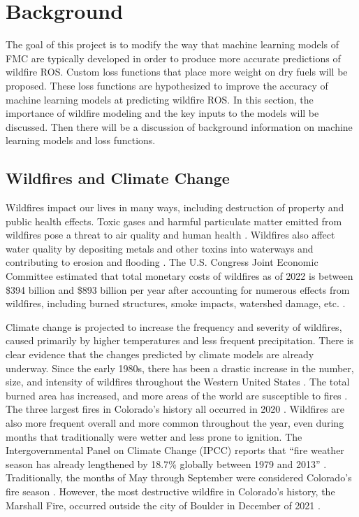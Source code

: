 \documentclass[11pt]{article}%
\begin{document}
\newpage
\tableofcontents
\newpage

\section{Background}

The goal of this project is to modify the way that machine learning models of FMC are typically developed in order to produce more accurate predictions of wildfire ROS. Custom loss functions that place more weight on dry fuels will be proposed. These loss functions are hypothesized to improve the accuracy of machine learning models at predicting wildfire ROS. In this section, the importance of wildfire modeling and the key inputs to the models will be discussed. Then there will be a discussion of background information on machine learning models and loss functions.

\subsection{Wildfires and Climate Change}

Wildfires impact our lives in many ways, including destruction of property and public health effects. Toxic gases and harmful particulate matter emitted from wildfires pose a threat to air quality and human health \citep[e.g.,][]{WHO-2024-WFS}. Wildfires also affect water quality by depositing metals and other toxins into waterways and contributing to erosion and flooding \citep{USGS-2024-WQA}. The U.S. Congress Joint Economic Committee estimated that total monetary costs of wildfires as of 2022 is between \$394 billion and \$893 billion per year after accounting for numerous effects from wildfires, including burned structures, smoke impacts, watershed damage, etc. \citep{JEC-2023-CEW}.

Climate change is projected to increase the frequency and severity of wildfires, caused primarily by higher temperatures and less frequent precipitation. There is clear evidence that the changes predicted by climate models are already underway. Since the early 1980s, there has been a drastic increase in the number, size, and intensity of wildfires throughout the Western United States \citep{Cartier-2022-UFQ}. The total burned area has increased, and more areas of the world are susceptible to fires \citep{IPCC-2021-LCI}. The three largest fires in Colorado’s history all occurred in 2020 \citep{CDFPC-2024-HWI}. Wildfires are also more frequent overall and more common throughout the year, even during months that traditionally were wetter and less prone to ignition. The Intergovernmental Panel on Climate Change (IPCC) reports that “fire weather season has already lengthened by 18.7\% globally between 1979 and 2013” \citep{IPCC-2021-LCI}. Traditionally, the months of May through September were considered Colorado’s fire season \citep{WFCA-2023-CFS}. However, the most destructive wildfire in Colorado’s history, the Marshall Fire, occurred outside the city of Boulder in December of 2021 \citep{CDFPC-2024-HWI}.
\end{document}
